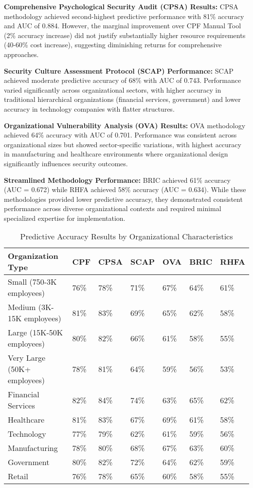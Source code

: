 \documentclass[10pt, twocolumn]{article}
\begin{document}
\textbf{Comprehensive Psychological Security Audit (CPSA) Results:} CPSA methodology achieved second-highest predictive performance with 81\% accuracy and AUC of 0.884. However, the marginal improvement over CPF Manual Tool (2\% accuracy increase) did not justify substantially higher resource requirements (40-60\% cost increase), suggesting diminishing returns for comprehensive approaches.

\textbf{Security Culture Assessment Protocol (SCAP) Performance:} SCAP achieved moderate predictive accuracy of 68\% with AUC of 0.743. Performance varied significantly across organizational sectors, with higher accuracy in traditional hierarchical organizations (financial services, government) and lower accuracy in technology companies with flatter structures.

\textbf{Organizational Vulnerability Analysis (OVA) Results:} OVA methodology achieved 64\% accuracy with AUC of 0.701. Performance was consistent across organizational sizes but showed sector-specific variations, with highest accuracy in manufacturing and healthcare environments where organizational design significantly influences security outcomes.

\textbf{Streamlined Methodology Performance:} BRIC achieved 61\% accuracy (AUC = 0.672) while RHFA achieved 58\% accuracy (AUC = 0.634). While these methodologies provided lower predictive accuracy, they demonstrated consistent performance across diverse organizational contexts and required minimal specialized expertise for implementation.

\begin{table*}[t]
\caption{Predictive Accuracy Results by Organizational Characteristics}
\label{tab:accuracy_by_org}
\centering
\begin{tabular}{@{}l l l l l l l@{}}
\toprule
\textbf{Organization Type} & \textbf{CPF} & \textbf{CPSA} & \textbf{SCAP} & \textbf{OVA} & \textbf{BRIC} & \textbf{RHFA} \\
\midrule
Small (750-3K employees) & 76\% & 78\% & 71\% & 67\% & 64\% & 61\% \\
Medium (3K-15K employees) & 81\% & 83\% & 69\% & 65\% & 62\% & 58\% \\
Large (15K-50K employees) & 80\% & 82\% & 66\% & 61\% & 58\% & 55\% \\
Very Large (50K+ employees) & 78\% & 81\% & 64\% & 59\% & 56\% & 53\% \\
\midrule
Financial Services & 82\% & 84\% & 74\% & 63\% & 65\% & 62\% \\
Healthcare & 81\% & 83\% & 67\% & 69\% & 61\% & 58\% \\
Technology & 77\% & 79\% & 62\% & 61\% & 59\% & 56\% \\
Manufacturing & 78\% & 80\% & 68\% & 67\% & 63\% & 60\% \\
Government & 80\% & 82\% & 72\% & 64\% & 62\% & 59\% \\
Retail & 76\% & 78\% & 65\% & 60\% & 58\% & 55\% \\
\bottomrule
\end{tabular}
\end{table*}
\end{document}
